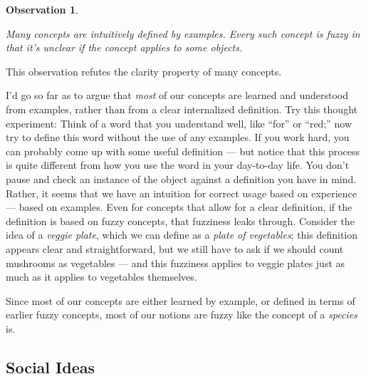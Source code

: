 \documentclass[11pt, oneside]{article}   	%
\newtheorem{obs}{Observation}
\begin{document}
\newcommand{\obsseven}{
    Many concepts are intuitively defined by examples.
    Every such concept is {\em fuzzy} in that it's unclear if the concept
    applies to some objects.
}
\begin{obs}\label{o7}
    \obsseven
\end{obs}

This observation refutes the clarity property of many concepts.

I'd go so far as to argue that {\em most} of our concepts are learned and
understood from examples, rather than from a clear internalized definition.
Try this thought experiment: Think of a word that you understand well, like
``for'' or ``red;'' now try to define this word without the use of any examples.
If you work hard, you can probably come up with some useful definition --- but
notice that this process is quite different from how you use the word in your
day-to-day life. You don't pause and check an instance of the object against a
definition you have in mind. Rather, it seems that we have an intuition for
correct usage based on experience --- based on examples.
Even for concepts that allow for a clear definition, if the definition is based
on fuzzy concepts, that fuzziness leaks through. Consider the idea of a {\em
veggie plate}, which we can define as a {\em plate of vegetables}; this
definition appears clear and straightforward, but we still have to ask if we
should count mushrooms as vegetables --- and this fuzziness applies to veggie
plates just as much as it applies to vegetables themselves.

Since most of our concepts are either learned by example, or defined in terms of
earlier fuzzy concepts,
most of our notions are fuzzy like the concept of a {\em species} is.

\subsection{Social Ideas}

%
%
\end{document}
